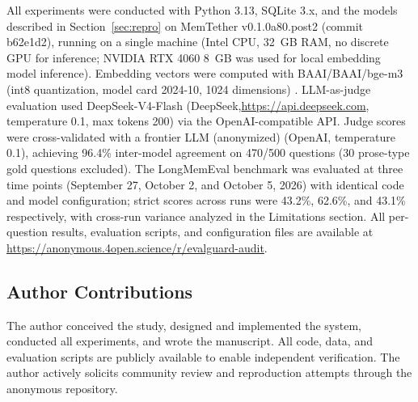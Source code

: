 \documentclass[11pt]{article}
\begin{document}
All experiments were conducted with Python 3.13, SQLite 3.x, and the models described in Section~\ref{sec:repro} on MemTether v0.1.0a80.post2 (commit b62e1d2), running on a single machine (Intel CPU, 32~GB RAM, no discrete GPU for inference; NVIDIA RTX 4060 8~GB was used for local embedding model inference). Embedding vectors were computed with BAAI/BAAI/bge-m3 (int8 quantization, model card 2024-10, 1024 dimensions) \citep{bge2023}. LLM-as-judge evaluation used DeepSeek-V4-Flash (DeepSeek,\url{https://api.deepseek.com}, temperature 0.1, max tokens 200) via the OpenAI-compatible API. Judge scores were cross-validated with a frontier LLM (anonymized) (OpenAI, temperature 0.1), achieving 96.4\% inter-model agreement on 470/500 questions (30 prose-type gold questions excluded). The LongMemEval benchmark was evaluated at three time points (September 27, October 2, and October 5, 2026) with identical code and model configuration; strict scores across runs were 43.2\%, 62.6\%, and 43.1\% respectively, with cross-run variance analyzed in the Limitations section. All per-question results, evaluation scripts, and configuration files are available at \url{https://anonymous.4open.science/r/evalguard-audit}.


\subsection*{Author Contributions}

The author conceived the study, designed and implemented the system, conducted all experiments, and wrote the manuscript. All code, data, and evaluation scripts are publicly available to enable independent verification. The author actively solicits community review and reproduction attempts through the anonymous repository.
\end{document}
